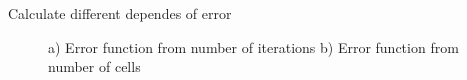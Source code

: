 Calculate different dependes of error

\begin{figure}[h]\label{ERROR}
\begin{minipage}[h]{0.49\linewidth}
\end{minipage}
\hfill
\begin{minipage}[h]{0.49\linewidth}
\end{minipage}
\caption{a) Error function from number of iterations b) Error function from
number of cells}
\end{figure}

